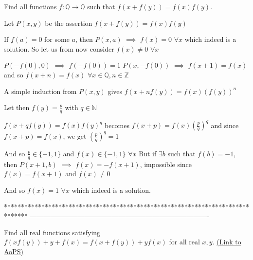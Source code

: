 \begin{solution}
	\begin{tcolorbox}Find all functions $f:\mathbb{Q}\to \mathbb{Q}$ such that $f(x+f(y))=f(x)f(y)$.\end{tcolorbox}
Let $P(x,y)$ be the assertion $f(x+f(y))=f(x)f(y)$

If $f(a)=0$ for some $a$, then $P(x,a)$ $\implies$ $\boxed{f(x)=0}$ $\forall x$ which indeed is a solution.
So let us from now consider $f(x)\ne 0$ $\forall x$

$P(-f(0),0)$ $\implies$ $f(-f(0))=1$
$P(x,-f(0))$ $\implies$ $f(x+1)=f(x)$ and so $f(x+n)=f(x)$ $\forall x\in\mathbb Q,n\in\mathbb Z$

A simple induction from $P(x,y)$ gives $f(x+nf(y))=f(x)(f(y))^n$

Let then $f(y)=\frac pq$ with $q\in\mathbb N$

$f(x+qf(y))=f(x)f(y)^q$ becomes $f(x+p)=f(x)\left(\frac pq\right)^q$ and since $f(x+p)=f(x)$, we get $\left(\frac pq\right)^q=1$

And so $\frac pq\in\{-1,1\}$ and $f(x)\in\{-1,1\}$ $\forall x$
But if $\exists b$ such that $f(b)=-1$, then $P(x+1,b)$ $\implies$ $f(x)=-f(x+1)$, impossible since $f(x)=f(x+1)$ and $f(x)\ne 0$

And so $\boxed{f(x)=1}$ $\forall x$ which indeed is a solution.
\end{solution}
*******************************************************************************
-------------------------------------------------------------------------------

\begin{problem}
	Find all real functions satisfying $f(xf(y))+y+f(x)=f(x+f(y))+yf(x)$ for all real $x,y$.
	\flushright \href{https://artofproblemsolving.com/community/c6h483271}{(Link to AoPS)}
\end{problem}



